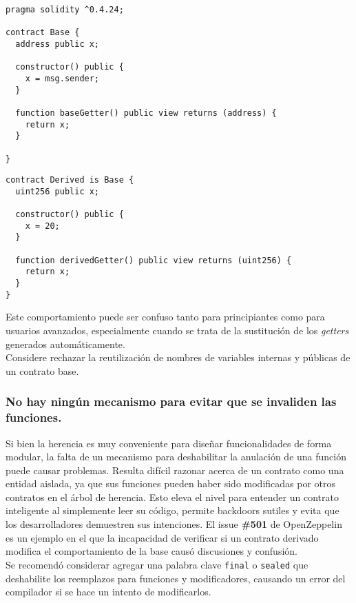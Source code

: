 \begin{lstlisting}[language=Solidity]
pragma solidity ^0.4.24;

contract Base {
  address public x;

  constructor() public {
    x = msg.sender;
  }

  function baseGetter() public view returns (address) {
    return x;
  }

}
\end{lstlisting}

\begin{lstlisting}[language=Solidity]
contract Derived is Base {
  uint256 public x;

  constructor() public {
    x = 20;
  }

  function derivedGetter() public view returns (uint256) {
    return x;
  }
}
\end{lstlisting}

Este comportamiento puede ser confuso tanto para principiantes como para usuarios avanzados, especialmente cuando se trata de la sustitución de los \textit{getters} generados automáticamente.\\

Considere rechazar la reutilización de nombres de variables internas y públicas de un contrato base.\\

\subsubsection{No hay ningún mecanismo para evitar que se invaliden las funciones.}

Si bien la herencia es muy conveniente para diseñar funcionalidades de forma modular, la falta de un mecanismo para deshabilitar la anulación de una función puede causar problemas. Resulta difícil razonar acerca de un contrato como una entidad aislada, ya que sus funciones pueden haber sido modificadas por otros contratos en el árbol de herencia. Esto eleva el nivel para entender un contrato inteligente al simplemente leer su código, permite backdoors sutiles y evita que los desarrolladores demuestren sus intenciones. El issue \textbf{\#501}\cite{OpenZeppelinIssue501} de OpenZeppelin es un ejemplo en el que la incapacidad de verificar si un contrato derivado modifica el comportamiento de la base causó discusiones y confusión.\\

Se recomendó considerar agregar una palabra clave \texttt{final} o \texttt{sealed} que deshabilite los reemplazos para funciones y modificadores, causando un error del compilador si se hace un intento de modificarlos.\\

